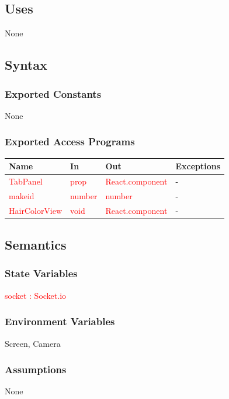 \documentclass[12pt, titlepage]{article}
\begin{document}
\subsection{Uses}
None

\subsection{Syntax}
\subsubsection{Exported Constants}
None

\subsubsection{Exported Access Programs}
\begin{center}
\begin{tabular}{p{4cm} p{3cm} p{4cm} p{4cm}}
\hline
\textbf{Name} & \textbf{In} & \textbf{Out} & \textbf{Exceptions} \\
\hline
\textcolor{red}{TabPanel} & \textcolor{red}{prop} & \textcolor{red}{React.component} & - \\
\textcolor{red}{makeid} & \textcolor{red}{number} & \textcolor{red}{number} & - \\
\textcolor{red}{HairColorView} & \textcolor{red}{void} & \textcolor{red}{React.component} & - \\
\hline
\end{tabular}
\end{center}

\subsection{Semantics}

\subsubsection{State Variables}
\textcolor{red}{socket : Socket.io} 

\subsubsection{Environment Variables}
Screen, Camera

\subsubsection{Assumptions}
None
\end{document}
